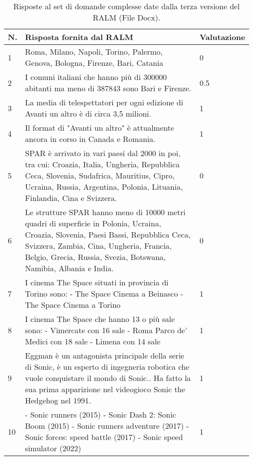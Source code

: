\begin{table}[H]
    \centering
    \begin{tabular}{|p{0.5cm} |p{6cm} |p{2cm}|}
        \hline
        \textbf{N}. & \textbf{Risposta fornita dal RALM} & \textbf{Valutazione} \\
        \hline
        1 & Roma, Milano, Napoli, Torino, Palermo, Genova, Bologna, Firenze, Bari, Catania & 0 \\
        \hline
        2 & I comuni italiani che hanno più di 300000 abitanti ma meno di 387843 sono Bari e Firenze. & 0.5 \\
        \hline
        3 & La media di telespettatori per ogni edizione di Avanti un altro è di circa 3,5 milioni. & 1 \\
        \hline
        4 & Il format di "Avanti un altro" è attualmente ancora in corso in Canada e Romania. & 1 \\
        \hline
        5 & SPAR è arrivato in vari paesi dal 2000 in poi, tra cui: Croazia, Italia, Ungheria, Repubblica Ceca, Slovenia, Sudafrica, Mauritius, Cipro, Ucraina, Russia, Argentina, Polonia, Lituania, Finlandia, Cina e Svizzera. & 0 \\
        \hline
        6 & Le strutture SPAR hanno meno di 10000 metri quadri di superficie in Polonia, Ucraina, Croazia, Slovenia, Paesi Bassi, Repubblica Ceca, Svizzera, Zambia, Cina, Ungheria, Francia, Belgio, Grecia, Russia, Svezia, Botswana, Namibia, Albania e India. & 0 \\
        \hline
        7 & I cinema The Space situati in provincia di Torino sono: 
        - The Space Cinema a Beinasco
        - The Space Cinema a Torino & 1 \\
        \hline
        8 & I cinema The Space che hanno 13 o più sale sono:
        - Vimercate con 16 sale
        - Roma Parco de' Medici con 18 sale
        - Limena con 14 sale & 1 \\
        \hline
        9 & Eggman è un antagonista principale della serie di Sonic, è un esperto di ingegneria robotica che vuole conquistare il mondo di Sonic.. Ha fatto la sua prima apparizione nel videogioco Sonic the Hedgehog nel 1991. & 1 \\
        \hline
        10 & - Sonic runners (2015)
        - Sonic Dash 2: Sonic Boom (2015)
        - Sonic runners adventure (2017)
        - Sonic forces: speed battle (2017)
        - Sonic speed simulator (2022) & 1 \\
        \hline
    \end{tabular}
    \caption{Risposte al set di domande complesse date dalla terza versione del RALM (File Docx).}
\end{table}

